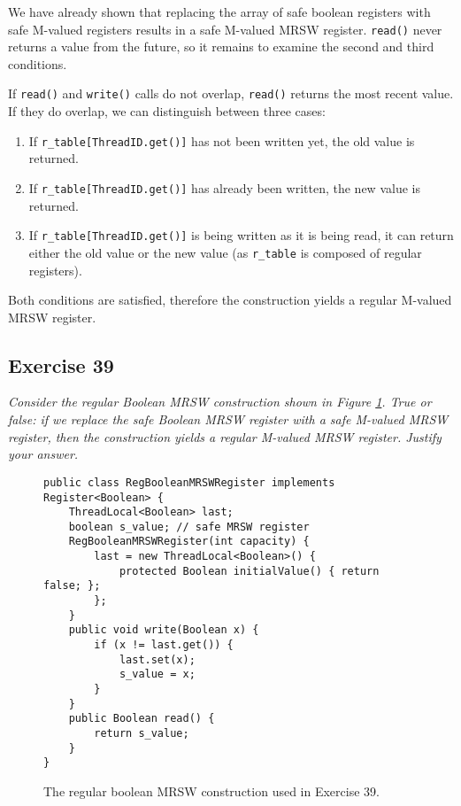 \documentclass[a4paper,10pt]{article}
\begin{document}
We have already shown that replacing the array of safe boolean registers with
safe M-valued registers results in a safe M-valued MRSW register. \lstinline|read()|
never returns a value from the future, so it remains to examine the second and third conditions.

If \lstinline|read()| and \lstinline|write()| calls do not overlap, \lstinline|read()|
returns the most recent value. If they do overlap, we can distinguish between three cases:

\begin{enumerate}
\item If \lstinline|r_table[ThreadID.get()]| has not been written yet, the old value
      is returned.
\item If \lstinline|r_table[ThreadID.get()]| has already been written, the new value
      is returned.
\item If \lstinline|r_table[ThreadID.get()]| is being written as it is being read,
      it can return either the old value or the new value (as \lstinline|r_table|
      is composed of regular registers).
\end{enumerate}

Both conditions are satisfied, therefore the construction yields a regular M-valued MRSW
register.


\subsection{Exercise 39}

\emph{Consider the regular Boolean MRSW construction shown in Figure \ref{fig:regularbooleanmrsw}.
True or false: if we replace the safe Boolean MRSW register with a safe M-valued
MRSW register, then the construction yields a regular M-valued MRSW register.
Justify your answer.}

\vspace{3mm}

\begin{figure}
\begin{lstlisting}
public class RegBooleanMRSWRegister implements Register<Boolean> {
    ThreadLocal<Boolean> last;
    boolean s_value; // safe MRSW register
    RegBooleanMRSWRegister(int capacity) {
        last = new ThreadLocal<Boolean>() {
            protected Boolean initialValue() { return false; };
        };
    }
    public void write(Boolean x) {
        if (x != last.get()) {
            last.set(x);
            s_value = x;
        }
    }
    public Boolean read() {
        return s_value;
    }
}
\end{lstlisting}
\caption{The regular boolean MRSW construction used in Exercise 39.}
\label{fig:regularbooleanmrsw}
\end{figure}
\end{document}
